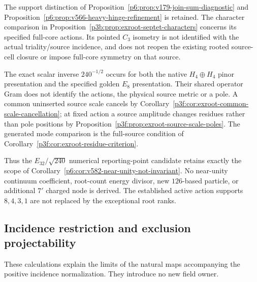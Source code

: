 \documentclass[11pt,a4paper]{article}
\begin{document}
The support distinction of
Proposition~\ref{p6:prop:v179-join-sum-diagnostic} and
Proposition~\ref{p6:prop:v566-heavy-hinge-refinement} is retained.
The character comparison in
Proposition~\ref{p3b:prop:exroot-septet-characters} concerns its
specified full-core actions. Its pointed \(C_3\) isometry is not
identified with the actual triality/source incidence, and does not
reopen the existing rooted source-cell closure or impose full-core
symmetry on that source.

\begin{remark}
\label{p6:rem:exroot-240-energy-status}
The exact scalar inverse \(240^{-1/2}\) occurs for both the native
\(H_4\oplus H_4\) pinor presentation and the specified golden \(E_8\)
presentation. Their shared operator Gram does not identify the actions,
the physical source metric or a pole. A common uninserted source scale
cancels by Corollary~\ref{p3f:cor:exroot-common-scale-cancellation};
at fixed action a source amplitude changes residues rather than pole
positions by Proposition~\ref{p3f:prop:exroot-source-scale-poles}.
The generated mode comparison is the full-source condition of
Corollary~\ref{p3f:cor:exroot-residue-criterion}.

Thus the \(E_{32}/\sqrt{240}\) numerical reporting-point candidate
retains exactly the scope of
Corollary~\ref{p6:cor:v582-near-unity-not-invariant}.
No near-unity continuum coefficient, root-count energy divisor,
new \(126\)-based particle, or additional \(7'\) charged node is derived.
The established active action supports \(8,4,3,1\) are not replaced by
the exceptional root ranks.
\end{remark}




\subsection{Incidence restriction and exclusion projectability}
\label{p6:app:v179-incidence-descent}

These calculations explain the limits of the natural maps accompanying
the positive incidence normalization.  They introduce no new field owner.
\end{document}

